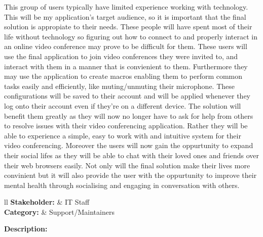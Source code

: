 This group of users typically have limited experience working 
with technology. This will be my application's target audience,
so it is important that the final solution is appropiate to 
their needs. These people will have spent most of their life
without technology so figuring out how to connect to and
properly interact in an online video conference may prove to
be difficult for them. These users will use the final 
application to join video conferences they were invited to,
and interact with them in a manner that is convienient to them.
Furthermore they may use the application to create macros
enabling them to perform common tasks easily and efficiently,
like muting/unmuting their microphone. These configurations
will be saved to their account and will be applied whenever 
they log onto their account even if they're on a different 
device. The solution will benefit them greatly as they will
now no longer have to ask for help from others to resolve
issues with their video conferencing application. Rather they
will be able to experience a simple, easy to work with and 
intuitive system for their video conferencing. Moreover the 
users will now gain the oppurtunity to expand their social 
lifes as they will be able to chat with their loved ones and 
friends over their web browsers easily. Not only will the 
final solution make their lives more convinient but it will 
also provide the user with the oppurtunity to improve their 
mental health through socialising and engaging in conversation
with others. \cite{social}
\vspace{0.2cm}

\noindent
\begin{tblr}{ll}
  \textbf{Stakeholder: } & IT Staff\\
  \textbf{Category: } & Support/Maintainers\\
\end{tblr}
\vspace{0.2cm}

\textbf{Description: } \\ \vspace{0.05cm}

